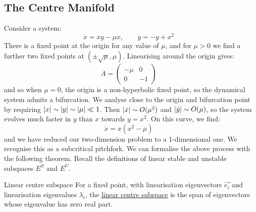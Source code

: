 \documentclass[../Main.tex]{subfiles}
\begin{document}
\subsection{The Centre Manifold}
Consider a system:
\begin{equation}
    \dot{x} = xy - \mu x,\qquad \dot{y} = -y + x^2
    \label{eqnBifSystem}
\end{equation}
There is a fixed point at the origin for any value of $\mu$, and for $\mu > 0$ we find a further two fixed points at $(\pm \sqrt{\mu}, \mu)$. Linearising around the origin gives:
\begin{equation*}
    A = 
    \begin{pmatrix}
        -\mu & 0 \\
        0 & -1
    \end{pmatrix}
\end{equation*}
and so when $\mu = 0$, the origin is a non-hyperbolic fixed point, so the dynamical system admits a bifurcation. We analyse close to the origin and bifurcation point by requiring $\left|x\right| \sim \left|y\right| \sim \left|\mu\right| \ll 1$. Then $\left|\dot x\right| \sim O(\mu^2)$ and $\left|\dot y\right| \sim O(\mu)$, so the system evolves much faster in $y$ than $x$ towards $y = x^2$. On this curve, we find:
\begin{equation*}
    \dot{x} = x(x^2 - \mu)
\end{equation*}
and we have reduced our two-dimension problem to a 1-dimensional one. We recognise this as a subcritical pitchfork. We can formalise the above process with the following theorem. Recall the definitions of linear stable and unstable subspaces $E^S$ and $E^U$.

\begin{definition}{Linear centre subspace}
    For a fixed point, with linearisation eigenvectors $\vec{e_i}$ and linearisation eigenvalues $\lambda_i$, the \underline{linear centre subspace} is the span of eigenvectors whose eigenvalue has zero real part.
\end{definition}
\end{document}
